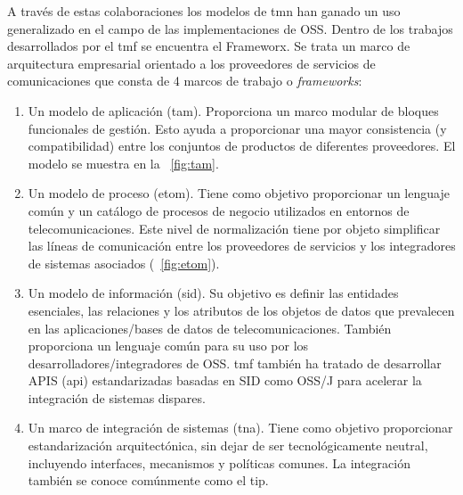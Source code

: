 A través de estas colaboraciones los modelos de \acrshort{tmn} han ganado un uso generalizado en el campo de las implementaciones de OSS. Dentro de los trabajos desarrollados por el \acrshort{tmf} se encuentra el Frameworx. Se trata un marco de arquitectura empresarial orientado a los proveedores de servicios de comunicaciones que consta de 4 marcos de trabajo o \emph{frameworks}:
\begin{enumerate}
\item Un modelo de aplicación (\acrfull{tam}). Proporciona un marco modular de bloques funcionales de gestión. Esto ayuda a proporcionar una mayor consistencia (y compatibilidad) entre los conjuntos de productos de diferentes proveedores. El modelo se muestra en la \figurename~\ref{fig:tam}.
\item Un modelo de proceso (\acrfull{etom}). Tiene como objetivo proporcionar un lenguaje común y un catálogo de procesos de negocio utilizados en entornos de telecomunicaciones. Este nivel de normalización tiene por objeto simplificar las líneas de comunicación entre los proveedores de servicios y los integradores de sistemas asociados (\figurename~\ref{fig:etom}).
\item Un modelo de información (\acrfull{sid}). Su objetivo es definir las entidades esenciales, las relaciones y los atributos de los objetos de datos que prevalecen en las aplicaciones/bases de datos de telecomunicaciones. También proporciona un lenguaje común para su uso por los desarrolladores/integradores de OSS. \acrshort{tmf} también ha tratado de desarrollar APIS (\acrlong{api}) estandarizadas basadas en SID como OSS/J para acelerar la integración de sistemas dispares.
\item Un marco de integración de sistemas (\acrfull{tna}). Tiene como objetivo proporcionar estandarización arquitectónica, sin dejar de ser tecnológicamente neutral, incluyendo interfaces, mecanismos y políticas comunes. La integración también se conoce comúnmente como el \acrfull{tip}.
\end{enumerate}

